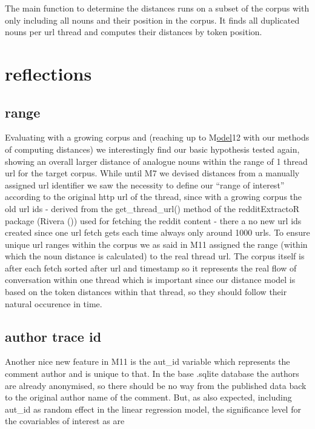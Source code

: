\documentclass[12pt,a4paper]{article}
\begin{document}
The main function to determine the distances runs on a subset of the corpus with only including all nouns and their position in the corpus. It finds all duplicated nouns per url thread and computes their distances by token position.

\section{reflections}\label{reflections}

\subsection{range}\label{range}

Evaluating with a growing corpus and (reaching up to M\href{}{odel}12 with our methods of computing distances) we interestingly find our basic hypothesis tested again, showing an overall larger distance of analogue nouns within the range of 1 thread url for the target corpus. While until M7 we devised distances from a manually assigned url identifier we saw the necessity to define our ``range of interest'' according to the original http url of the thread, since with a growing corpus the old url ids - derived from the get\_thread\_url() method of the redditExtractoR package (Rivera ()) used for fetching the reddit content - there a no new url ids created since one url fetch gets each time always only around 1000 urls. To ensure unique url ranges within the corpus we as said in M11 assigned the range (within which the noun distance is calculated) to the real thread url. The corpus itself is after each fetch sorted after url and timestamp so it represents the real flow of conversation within one thread which is important since our distance model is based on the token distances within that thread, so they should follow their natural occurence in time.

\subsection{author trace id}\label{author-trace-id}

Another nice new feature in M11 is the aut\_id variable which represents the comment author and is unique to that. In the base .sqlite database the authors are already anonymised, so there should be no way from the published data back to the original author name of the comment. But, as also expected, including aut\_id as random effect in the linear regression model, the significance level for the covariables of interest as are
\end{document}
